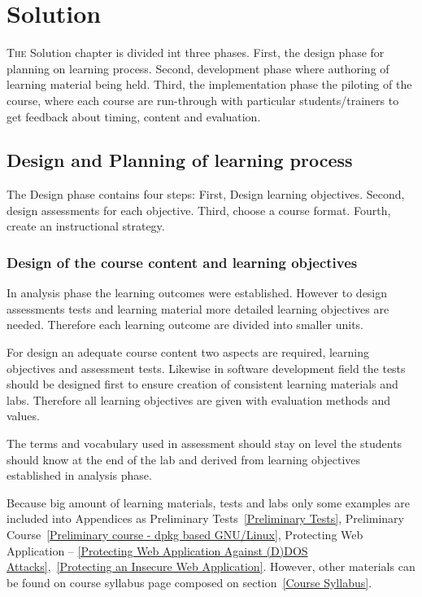 \chapter{Solution}
\label{solution}
\lettrine[lraise=0.1, nindent=0em, slope=-.5em]{\color{Violet}T}{he} Solution chapter is divided int three phases. First, the design phase for planning on learning process. Second, development phase where authoring of learning material being held. Third, the implementation phase the piloting of the course, where each course are run-through with particular students/trainers to get feedback about timing, content and evaluation.



 
\section{Design and Planning of learning process}
The Design phase contains four steps: First, Design learning objectives. Second, design assessments for each objective. Third, choose a course format. Fourth, create an instructional strategy. \citep{website:design_phase_ADDIE}


\subsection{Design of the course content and learning objectives}

In analysis phase the learning outcomes were established. However to design assessments tests and learning material more detailed learning objectives are needed. Therefore each learning outcome are divided into smaller units.

For design an adequate course content two aspects are required, learning objectives and assessment tests. Likewise in software development field the tests should be designed first to ensure creation of consistent learning materials and labs. Therefore all learning objectives are given with evaluation methods and values.  

The terms and vocabulary used in assessment should stay on level the students should know at the end of the lab and derived from learning objectives established in analysis phase.

Because big amount of learning materials, tests and labs only some examples are included into Appendices as Preliminary Tests~\ref{Preliminary Tests}, Preliminary Course~\ref{Preliminary course - dpkg based GNU/Linux}, Protecting Web Application -- \ref{Protecting Web Application Against (D)DOS Attacks},~\ref{Protecting an Insecure Web Application}. However, other materials can be found on course syllabus page composed on section~\ref{Course Syllabus}.


